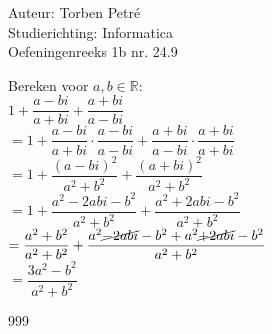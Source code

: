 \documentclass[a4paper]{article}
\newcommand{\R}{\mathbb{R}}
\begin{document}
  
\noindent \large Auteur: Torben Petré \\
\noindent \large Studierichting: Informatica\\
\noindent \large Oefeningenreeks 1b nr. 24.9\\

\medskip

\normalsize

Bereken voor $a, b \in \R$:\\

$1 + \dfrac{a - bi}{a + bi} + \dfrac{a + bi}{a - bi}$\\

$= 1 + \dfrac{a - bi}{a + bi} \cdot \dfrac{a - bi}{a - bi} + \dfrac{a + bi}{a - bi} \cdot \dfrac{a + bi}{a + bi}$\\

$= 1 + \dfrac{(a - bi)^2}{a^2 + b^2} + \dfrac{(a + bi)^2}{a^2 + b^2}$\\

$= 1 + \dfrac{a^2 - 2abi - b^2}{a^2 + b^2} + \dfrac{a^2 + 2abi - b^2}{a^2 + b^2}$\\

$= \dfrac{a^2 + b^2}{a^2 + b^2} + \dfrac{a^2 \cancel{- 2abi} - b^2 + a^2 \cancel{+ 2abi} - b^2}{a^2 + b^2}$\\

$= \dfrac{3a^2 - b^2}{a^2 + b^2}$\\

\begin{thebibliography}{999}
\end{thebibliography}
\end{document}
